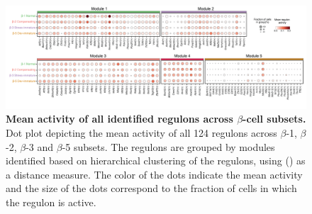 \begin{figure}[H]
\centering
\includegraphics[width=\linewidth]{Appendix2/Fig/F3-18-01.png}
\caption[Mean activity of all identified regulons across $\beta$-cell subsets]{\textbf{Mean activity of all identified regulons across $\beta$-cell subsets.} Dot plot depicting the mean activity of all 124 regulons across $\beta$-1, $\beta$-2, $\beta$-3 and $\beta$-5 subsets. The regulons are grouped by modules identified based on hierarchical clustering of the regulons, using  () as a distance measure. The color of the dots indicate the mean activity and the size of the dots correspond to the fraction of cells in which the regulon is active.}
\label{fig:app_chp3_scenic_betasubsets}
\end{figure}
\vspace{-23pt}







